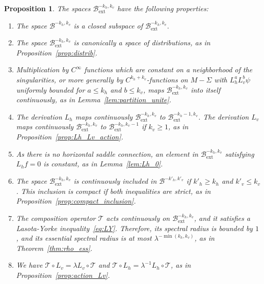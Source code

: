 \documentclass[JEP,XML,SOM,Unicode]{cedram}
\newcommand{\ext}{\mathrm{ext}}
\newcommand{\boB}{\mathcal{B}}
\newcommand{\boT}{\mathcal{T}}
\newtheorem{prop}[thm]{Proposition}
\theoremstyle{definition}
\numberwithin{equation}{section}
\begin{document}
\pagebreak[2]
\begin{prop}
\label{prop:ext} The spaces $\boB_{\ext}^{-k_h, k_v}$ have the following
properties:
\begin{enumerate}
\item The space $\boB^{-k_h, k_v}$ is a closed subspace of
$\boB_{\ext}^{-k_h, k_v}$.
\item The space $\boB_{\ext}^{-k_h, k_v}$ is canonically a space of
distributions, as in Proposition~\ref{prop:distrib}.
\item Multiplication by $C^\infty$ functions which are constant on a
neighborhood of the singularities, or more generally by
$C^{k_h+k_v}$-functions on $M-\Sigma$ with $L_h^a L_v^b \psi$ uniformly
bounded for $a \leq k_h$ and $b \leq k_v$, maps $\boB_{\ext}^{-k_h,
k_v}$ into itself continuously, as in Lemma~\ref{lem:partition_unite}.
\item The derivation $L_h$ maps continuously $\boB_{\ext}^{-k_h, k_v}$ to
$\boB_{\ext}^{-k_h-1, k_v}$. The derivation $L_v$ maps continuously
$\boB_{\ext}^{-k_h, k_v}$ to $\boB_{\ext}^{-k_h, k_v-1}$ if $k_v \geq 1$,
as in Proposition~\ref{prop:Lh_Lv_action}.
\item As there is no horizontal saddle connection, an element in
$\boB_{\ext}^{-k_h, k_v}$ satisfying $L_h f=0$ is constant, as in
Lemma~\ref{lem:Lh_0}.
\item The space $\boB_{\ext}^{-k_h, k_v}$ is continuously included in
$\boB^{-k'_h, k'_v}$ if $k'_h \geq k_h$ and $k'_v\leq k_v$. This
inclusion is compact if both inequalities are strict, as in
Proposition~\ref{prop:compact_inclusion}.
\item \label{prop:Text} The composition operator $\boT$ acts continuously
on $\boB_{\ext}^{-k_h, k_v}$, and it satisfies a Lasota-Yorke
inequality~\eqref{eq:LY}. Therefore, its spectral radius is bounded by
$1$, and its essential spectral radius is at most $\lambda^{-\min(k_h,
k_v)}$, as in Theorem~\ref{thm:rho_ess}.
\item We have $\boT \circ L_v = \lambda L_v \circ \boT$ and $\boT \circ L_h
= \lambda^{-1} L_h\circ \boT$, as in Proposition~\ref{prop:action_Lv}.
\end{enumerate}
\end{prop}
\end{document}
